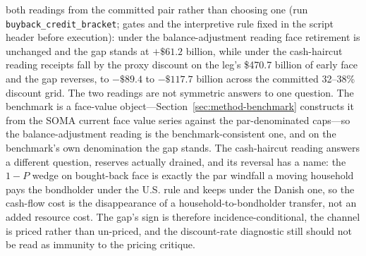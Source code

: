 \documentclass[12pt]{article}
\begin{document}
both readings from the committed pair rather than choosing one (run \texttt{buyback\_credit\_bracket}; gates and the interpretive rule fixed in the script header before execution): under the balance-adjustment reading face retirement is unchanged and the gap stands at $+\$61.2$ billion, while under the cash-haircut reading receipts fall by the proxy discount on the leg's \$470.7 billion of early face and the gap reverses, to $-\$89.4$ to $-\$117.7$ billion across the committed 32--38\% discount grid. The two readings are not symmetric answers to one question. The benchmark is a face-value object---Section~\ref{sec:method-benchmark} constructs it from the SOMA current face value series against the par-denominated caps---so the balance-adjustment reading is the benchmark-consistent one, and on the benchmark's own denomination the gap stands. The cash-haircut reading answers a different question, reserves actually drained, and its reversal has a name: the $1-P$ wedge on bought-back face is exactly the par windfall a moving household pays the bondholder under the U.S. rule and keeps under the Danish one, so the cash-flow cost is the disappearance of a household-to-bondholder transfer, not an added resource cost. The gap's sign is therefore incidence-conditional, the channel is priced rather than un-priced, and the discount-rate diagnostic still should not be read as immunity to the pricing critique.
\end{document}
